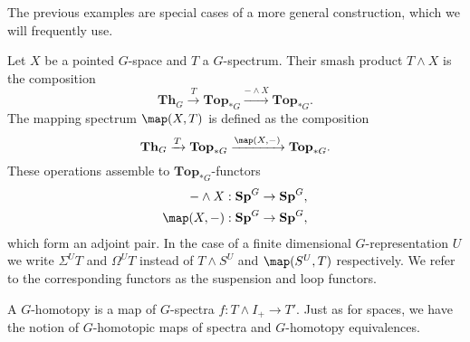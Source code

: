 The previous examples are special cases of a more general construction,
which we will frequently use.
\begin{mydef}
Let $X$ be a pointed $G$-space and $T$ a $G$-spectrum. Their
smash product $T\wedge X$ is the composition
\[
\mathbf{Th}_G\xrightarrow{T}\mathbf{Top}_{\ast G}
\xrightarrow{-\wedge X} \mathbf{Top}_{\ast G}.
\]
The mapping spectrum $\map(X,T)$ is defined as the composition
\[
\mathbf{Th}_G\xrightarrow{T}\mathbf{Top}_{\ast G}
\xrightarrow{\map(X,-)} \mathbf{Top}_{\ast G}.
\]
These operations assemble to $\mathbf{Top}_{\ast G}$-functors
\begin{align*}
-\wedge X: \mathbf{Sp}^G&\to \mathbf{Sp}^G,\\
\map(X,-):\mathbf{Sp}^G &\to \mathbf{Sp}^G,
\end{align*}
which form an adjoint pair.
In the case of a finite dimensional $G$-representation $U$
we write $\Sigma^U T$ and $\Omega^U T$ instead
of $T\wedge S^U$ and $\map(S^U,T)$ respectively. We refer to the corresponding functors
as the suspension and loop functors.
\end{mydef}
\begin{mydef}
A $G$-homotopy is a map of $G$-spectra $f:T\wedge I_+\to T'$. Just as for spaces,
we have the notion of $G$-homotopic maps of spectra and $G$-homotopy
equivalences.
\end{mydef}




%
%
%

